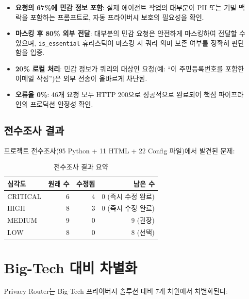 \documentclass[11pt,a4paper]{article}
\begin{document}
\begin{itemize}[nosep]
  \item \textbf{요청의 67\%에 민감 정보 포함}: 실제 에이전트 작업의 대부분이 PII 또는 기밀 맥락을 포함하는 프롬프트로, 자동 프라이버시 보호의 필요성을 확인.
  \item \textbf{마스킹 후 80\% 외부 전달}: 대부분의 민감 요청은 안전하게 마스킹하여 전달할 수 있으며, \texttt{is\_essential} 휴리스틱이 마스킹 시 쿼리 의미 보존 여부를 정확히 판단함을 입증.
  \item \textbf{20\% 로컬 처리}: 민감 정보가 쿼리의 대상인 요청(예: ``이 주민등록번호를 포함한 이메일 작성'')은 외부 전송이 올바르게 차단됨.
  \item \textbf{오류율 0\%}: 46개 요청 모두 HTTP 200으로 성공적으로 완료되어 핵심 파이프라인의 프로덕션 안정성 확인.
\end{itemize}

\subsection{전수조사 결과}

프로젝트 전수조사(95 Python + 11 HTML + 22 Config 파일)에서 발견된 문제:

\begin{table}[h]
\centering
\begin{tabular}{@{}lrrr@{}}
\toprule
심각도 & 원래 수 & 수정됨 & 남은 수 \\
\midrule
CRITICAL & 6 & 4 & 0 (즉시 수정 완료) \\
HIGH & 8 & 3 & 0 (즉시 수정 완료) \\
MEDIUM & 9 & 0 & 9 (권장) \\
LOW & 8 & 0 & 8 (선택) \\
\bottomrule
\end{tabular}
\caption{전수조사 결과 요약}
\end{table}

\section{Big-Tech 대비 차별화}

Privacy Router는 Big-Tech 프라이버시 솔루션 대비 7개 차원에서 차별화된다:
\end{document}
